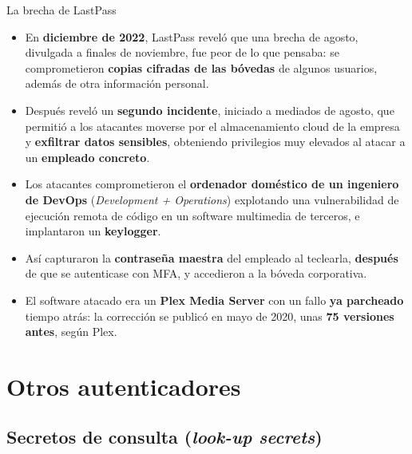 \documentclass[11pt,a4paper]{report}
\begin{document}
\begin{ejemplo}{La brecha de LastPass}
\begin{itemize}
  \item En \textbf{diciembre de 2022}, LastPass reveló que una brecha de agosto, divulgada a finales de noviembre, fue peor de lo que pensaba: se comprometieron \textbf{copias cifradas de las bóvedas} de algunos usuarios, además de otra información personal.
  \item Después reveló un \textbf{segundo incidente}, iniciado a mediados de agosto, que permitió a los atacantes moverse por el almacenamiento cloud de la empresa y \textbf{exfiltrar datos sensibles}, obteniendo privilegios muy elevados al atacar a un \textbf{empleado concreto}.
  \item Los atacantes comprometieron el \textbf{ordenador doméstico de un ingeniero de DevOps} (\emph{Development + Operations}) explotando una vulnerabilidad de ejecución remota de código en un software multimedia de terceros, e implantaron un \textbf{keylogger}.
  \item Así capturaron la \textbf{contraseña maestra} del empleado al teclearla, \textbf{después} de que se autenticase con MFA, y accedieron a la bóveda corporativa.
  \item El software atacado era un \textbf{Plex Media Server} con un fallo \textbf{ya parcheado} tiempo atrás: la corrección se publicó en mayo de 2020, unas \textbf{75 versiones antes}, según Plex.
\end{itemize}
\end{ejemplo}
 
\chapter{Otros autenticadores}\label{cap:otros}
 
\section{Secretos de consulta (\emph{look-up secrets})}
 
\end{document}
